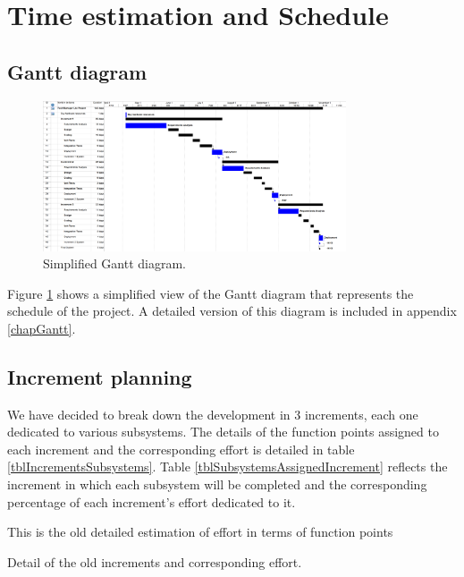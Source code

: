 \section{Time estimation and Schedule}
\label{secTimeEstimation}
\subsection{Gantt diagram}

\begin{figure}[hbtp]
\centering
\includegraphics[width=0.8\textwidth]{img/GanttDiagram.png}
\caption{Simplified Gantt diagram.}
\label{figGanttSimple}
\end{figure}

Figure \ref{figGanttSimple} shows a simplified view of the Gantt diagram that represents the schedule of the project. A detailed version of this diagram is included in appendix \ref{chapGantt}.

\subsection{Increment planning}

We have decided to break down the development in 3 increments, each one dedicated to various subsystems. The details of the function points assigned to each increment and the corresponding effort is detailed in table \ref{tblIncrementsSubsystems}. Table \ref{tblSubsystemsAssignedIncrement} reflects the increment in which each subsystem will be completed and the corresponding percentage of each increment's effort dedicated to it.

This is the old detailed estimation of effort in terms of function points 

\begin{table}[hbtp]
\centering

\caption{Detail of the old increments and corresponding effort.}
\label{tblIncrementsSubsystems}
\end{table}


